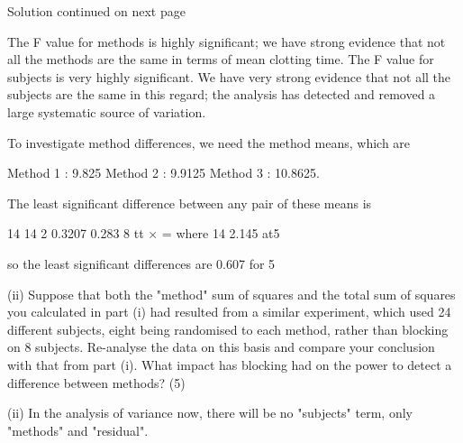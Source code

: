\documentclass[a4paper,12pt]{article}
\begin{document}
Solution continued on next page 
 
The F value for methods is highly significant;  we have strong evidence that not all the methods are the same in terms of mean clotting time.  The F value for subjects is very highly significant.  We have very strong evidence that not all the subjects are the same in this regard;  the analysis has detected and removed a large systematic source of variation. 
 
 
 
To investigate method differences, we need the method means, which are 
 
Method 1 :   9.825         Method 2 :   9.9125         Method 3 :   10.8625. 
 
The least significant difference between any pair of these means is 
 
14 14 2 0.3207 0.283 8 tt × =     where   14 2.145 at5%
 
so the least significant differences are 0.607 for 5%


\newpage
\begin{framed}
 (ii) Suppose that both the "method" sum of squares and the total sum of squares you calculated in part (i) had resulted from a similar experiment, which used 24 different subjects, eight being randomised to each method, rather than blocking on 8 subjects.  Re-analyse the data on this basis and compare your conclusion with that from part (i).  What impact has blocking had on the power to detect a difference between methods? (5) 

\end{framed}
 
 
 
(ii) In the analysis of variance now, there will be no "subjects" term, only "methods" and "residual". 
\end{document}
